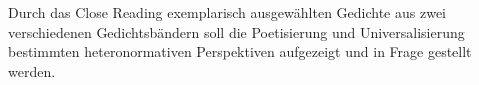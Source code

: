 \begin{comment}
  [Kolodny1980]
  feministische literaturkritik wird anscheinend zur sau gemacht, weil sie kein system/program hat: "lack of systematic coherence"
  das ist auch gleichzeitig die stärke der bewegung: diversity, pluralism
  ``All the feminist is asserting, then, is her own equivalent
  right to liberate new (and perhaps different) significances from
  these same texts; and, at the same time, her right to choose which
  features of a text she takes as relevant because she is, after all, ask-
  ing new and different questions of it.''~\cite{Kolodny1980}
  ``Robert Scholes, from whom I've been quoting, goes so far as to assert
  that "there is no single 'right' reading for any complex literary
  work,"''
  ``we entertain the possibility
  that different readings, even of the same text, may be differently
  useful, even illuminating, within different contexts of inquiry.''
  ``what we give up is simply the arrogance of
  claiming that our work is either exhaustive or definitive.''
  ``If feminist criticism calls anything into
  question, it must be that dog-eared myth of intellectual neutrality.''
\end{comment}

\begin{comment}
  * literatur/sprache shape our minds
  * wachsamkeit/Sensibilität schaffen fürs Erkennen patriarchalischen Projekte, die mittels "universelle Gefühle", "schöne Liebeslyrik" vermittelt werden/dafür verkauft werden

  immer noch zu schwammig..

  [Kolodny1980]
  Feminist Readings of male authors: discovering/exposing power relations men-women, that are taken for natural and granted


\end{comment}


Durch das Close Reading exemplarisch ausgewählten Gedichte aus zwei verschiedenen Gedichtsbändern soll die Poetisierung und Universalisierung bestimmten heteronormativen Perspektiven aufgezeigt und in Frage gestellt werden.

